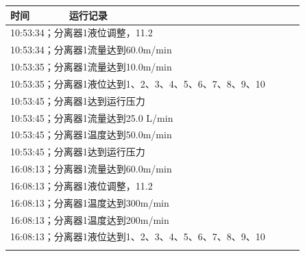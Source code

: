 \documentclass[UTF8,10pt,a4paper,fontset=fandol]{ctexart}
\newcommand{\fieldvalue}[1]{#1}
\begin{document}
\begin{center}
\begin{minipage}[t]{0.47\linewidth}
\scriptsize
\begin{tabular}{|p{0.18\linewidth}|p{0.72\linewidth}|}
\hline
时间 & 运行记录\\ \hline
\multicolumn{2}{|l|}{
\fieldvalue{10:53:34；分离器1液位调整，11.2}} \\ \hline
\multicolumn{2}{|l|}{
\fieldvalue{10:53:34；分离器1流量达到60.0m/min}} \\ \hline
\multicolumn{2}{|l|}{
\fieldvalue{10:53:35；分离器1流量达到10.0m/min}} \\ \hline
\multicolumn{2}{|l|}{
\fieldvalue{10:53:35；分离器1液位达到1、2、3、4、5、6、7、8、9、10}} \\ \hline
\multicolumn{2}{|l|}{
\fieldvalue{10:53:45；分离器1达到运行压力}} \\ \hline
\multicolumn{2}{|l|}{
\fieldvalue{10:53:45；分离器1流量达到25.0 L/min}} \\ \hline
\multicolumn{2}{|l|}{
\fieldvalue{10:53:45；分离器1温度达到50.0m/min}} \\ \hline
\multicolumn{2}{|l|}{
\fieldvalue{10:53:45；分离器1达到运行压力}} \\ \hline
\multicolumn{2}{|l|}{
\fieldvalue{16:08:13；分离器1流量达到60.0m/min}} \\ \hline
\multicolumn{2}{|l|}{
\fieldvalue{16:08:13；分离器1液位调整，11.2}} \\ \hline
\multicolumn{2}{|l|}{
\fieldvalue{16:08:13；分离器1温度达到300m/min}} \\ \hline
\multicolumn{2}{|l|}{
\fieldvalue{16:08:13；分离器1温度达到200m/min}} \\ \hline
\multicolumn{2}{|l|}{
\fieldvalue{16:08:13；分离器1液位达到1、2、3、4、5、6、7、8、9、10}} \\ \hline
\multicolumn{2}{|l|}{
}
\end{tabular}
\end{minipage}
\end{center}
\end{document}
